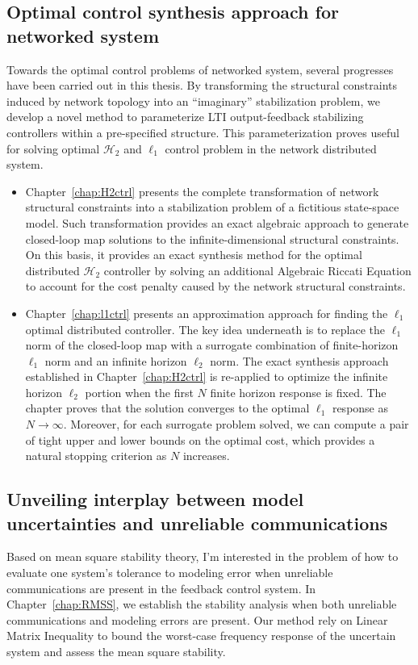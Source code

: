 \subsection{Optimal control synthesis approach for networked system}
Towards the optimal control problems of networked system, several progresses have been carried out in this thesis. By transforming the structural constraints induced by network topology into an ``imaginary'' stabilization problem, we develop a novel method to parameterize LTI output-feedback stabilizing controllers within a pre-specified structure. This parameterization proves useful for solving optimal \(\mathcal{H}_2\) and \(\ell_1\) control problem in the network distributed system.
\begin{itemize}
    \item[$\blacksquare$] Chapter~\ref{chap:H2ctrl} presents the complete transformation of network structural constraints into a stabilization problem of a fictitious state-space model. 
    Such transformation provides an exact algebraic approach to generate closed-loop map solutions to the infinite-dimensional structural constraints. On this basis, it provides an exact synthesis method for the optimal distributed \(\mathcal{H}_2\) controller by solving an additional Algebraic Riccati Equation to account for the cost penalty caused by the network structural constraints. 
    \item[$\blacksquare$] Chapter~\ref{chap:l1ctrl} presents an approximation approach for finding the \(\ell_1\) optimal distributed controller. The key idea underneath is to replace the \(\ell_1\) norm of the closed-loop map with a surrogate combination of finite-horizon \(\ell_1\) norm and an infinite horizon \(\ell_2\) norm. The exact synthesis approach established in Chapter~\ref{chap:H2ctrl} is re-applied to optimize the infinite horizon \(\ell_2\) portion when the first \(N\) finite horizon response is fixed. The chapter proves that the solution converges to the optimal \(\ell_1\) response as \(N \to \infty\). Moreover, for each surrogate problem solved, we can compute a pair of tight upper and lower bounds on the optimal cost, which provides a natural stopping criterion as \(N\) increases. 
\end{itemize}

\subsection{Unveiling interplay between model uncertainties and unreliable communications}
Based on mean square stability theory, I'm interested in the problem of how to evaluate one system's tolerance to modeling error when unreliable communications are present in the feedback control system. In Chapter~\ref{chap:RMSS}, we establish the stability analysis when both unreliable communications and modeling errors are present. Our method rely on Linear Matrix Inequality to bound the worst-case frequency response of the uncertain system and assess the mean square stability.

